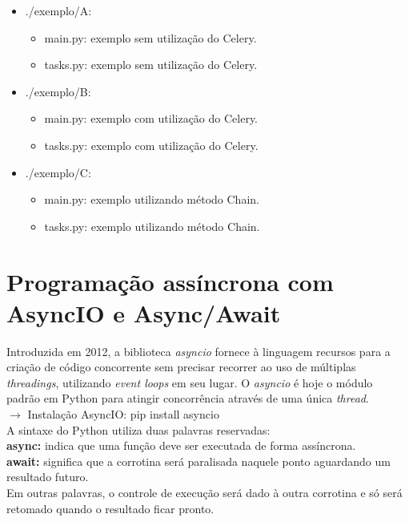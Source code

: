 \documentclass{beamer}
\begin{document}
 	\begin{itemize}
   		\item ./exemplo/A: \\
	 		\begin{itemize}
				\item main.py: exemplo sem utilização do Celery. \\
				\item tasks.py: exemplo sem utilização do Celery. \\
		 	\end{itemize}
   		\item ./exemplo/B: \\
	 		\begin{itemize}
				\item main.py: exemplo com utilização do Celery. \\
				\item tasks.py: exemplo com utilização do Celery. \\
		 	\end{itemize}
   		\item ./exemplo/C: \\
	 		\begin{itemize}
				\item main.py: exemplo utilizando método Chain. \\
				\item tasks.py: exemplo utilizando método Chain. \\
			 \end{itemize}  					
	\end{itemize}

	\newpage

	\section{Programação assíncrona com AsyncIO e Async/Await}
	Introduzida em 2012, a biblioteca \textit{asyncio} fornece à linguagem recursos para a criação de código concorrente sem precisar recorrer ao uso de múltiplas \textit{threadings}, utilizando \textit{event loops} em seu lugar. O \textit{asyncio} é hoje o módulo padrão em Python para atingir concorrência através de uma única \textit{thread}. \\
	$\rightarrow$ Instalação AsyncIO: pip install asyncio \\
	A sintaxe do Python utiliza duas palavras reservadas: \\
 	\textbf{async:} indica que uma função deve ser executada de forma assíncrona. \\
 	\textbf{await:} significa que a corrotina será paralisada naquele ponto aguardando um resultado futuro. \\
 	Em outras palavras, o controle de execução será dado à outra corrotina e só será retomado quando o resultado ficar pronto.
\end{document}
